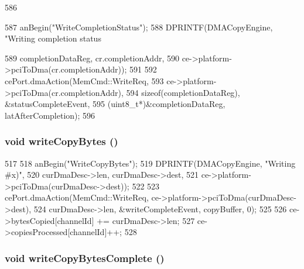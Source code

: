 \begin{DoxyCode}
586 {
587     anBegin("WriteCompletionStatus");
588     DPRINTF(DMACopyEngine, "Writing completion status %
      
589             completionDataReg, cr.completionAddr,
590             ce->platform->pciToDma(cr.completionAddr));
591 
592     cePort.dmaAction(MemCmd::WriteReq,
593                      ce->platform->pciToDma(cr.completionAddr),
594                      sizeof(completionDataReg), &statusCompleteEvent,
595                      (uint8_t*)&completionDataReg, latAfterCompletion);
596 }
\end{DoxyCode}
\hypertarget{classCopyEngine_1_1CopyEngineChannel_aa538c330f51ea59fafe7a1d37a776111}{
\subsubsection[{writeCopyBytes}]{\setlength{\rightskip}{0pt plus 5cm}void writeCopyBytes ()}}
\label{classCopyEngine_1_1CopyEngineChannel_aa538c330f51ea59fafe7a1d37a776111}



\begin{DoxyCode}
517 {
518     anBegin("WriteCopyBytes");
519     DPRINTF(DMACopyEngine, "Writing %
      #x)\n",
520            curDmaDesc->len, curDmaDesc->dest,
521            ce->platform->pciToDma(curDmaDesc->dest));
522 
523     cePort.dmaAction(MemCmd::WriteReq, ce->platform->pciToDma(curDmaDesc->dest),
524                      curDmaDesc->len, &writeCompleteEvent, copyBuffer, 0);
525 
526     ce->bytesCopied[channelId] += curDmaDesc->len;
527     ce->copiesProcessed[channelId]++;
528 }
\end{DoxyCode}
\hypertarget{classCopyEngine_1_1CopyEngineChannel_a34b0271502a103b28409e1796b16b95b}{
\subsubsection[{writeCopyBytesComplete}]{\setlength{\rightskip}{0pt plus 5cm}void writeCopyBytesComplete ()}}
\label{classCopyEngine_1_1CopyEngineChannel_a34b0271502a103b28409e1796b16b95b}



